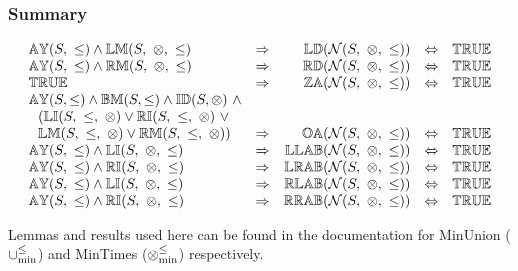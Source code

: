 \documentclass[../Summary.tex]{subfiles}
\begin{document}
\subsubsection{Summary}

\[
\begin{array}{lcrcl} 
\propname{AY}(S,\ \leq) \wedge \propname{LM}(S,\ \otimes,\ \leq)
	& \Rightarrow
	& \propname{LD}(\mathcal{N}(S,\ \otimes,\ \leq)) 
    & \Leftrightarrow 
    & \propname{TRUE}
    \\ 
\propname{AY}(S,\ \leq) \wedge \propname{RM}(S,\ \otimes,\ \leq)
	& \Rightarrow
	& \propname{RD}(\mathcal{N}(S,\ \otimes,\ \leq)) 
    & \Leftrightarrow 
    & \propname{TRUE}
    \\ 
\propname{TRUE}
	& \Rightarrow
	& \propname{ZA}(\mathcal{N}(S,\ \otimes,\ \leq)) 
    & \Leftrightarrow 
    & \propname{TRUE}
    \\ 
\propname{AY}(S,\leq) \wedge \propname{BM}(S,\leq) \wedge \propname{ID}(S,\otimes) \ \wedge \\
\ \ (\propname{LI}(S,\ \leq,\ \otimes) \vee \propname{RI}(S,\ \leq,\ \otimes) \ \vee \\
\ \ \propname{LM}(S,\ \leq,\ \otimes) \vee \propname{RM}(S,\ \leq,\ \otimes))
	& \Rightarrow 
	& \propname{OA}(\mathcal{N}(S,\ \otimes,\ \leq)) 
    & \Leftrightarrow 
    & \propname{TRUE}
    \\ 
\propname{AY}(S,\ \leq) \wedge \propname{LI}(S,\ \otimes,\ \leq) 
	& \Rightarrow 
	& \propname{LLAB}(\mathcal{N}(S,\ \otimes,\ \leq)) 
    & \Leftrightarrow 
    & \propname{TRUE}
    \\ 
\propname{AY}(S,\ \leq) \wedge \propname{RI}(S,\ \otimes,\ \leq) 
	& \Rightarrow 
	& \propname{LRAB}(\mathcal{N}(S,\ \otimes,\ \leq)) 
    & \Leftrightarrow 
    & \propname{TRUE}
    \\
\propname{AY}(S,\ \leq) \wedge \propname{LI}(S,\ \otimes,\ \leq) 
	& \Rightarrow 
	& \propname{RLAB}(\mathcal{N}(S,\ \otimes,\ \leq)) 
    & \Leftrightarrow 
    & \propname{TRUE}
    \\ 
\propname{AY}(S,\ \leq) \wedge \propname{RI}(S,\ \otimes,\ \leq) 
	& \Rightarrow 
	& \propname{RRAB}(\mathcal{N}(S,\ \otimes,\ \leq)) 
    & \Leftrightarrow 
    & \propname{TRUE}
    \\
\end{array} 
\] 

Lemmas and results used here can be found in the documentation for MinUnion ($\mathbin{\cup_{\min}^{\leq}}$) and MinTimes ($\mathbin{\otimes_{\min}^{\leq}}$) respectively.
\end{document}
